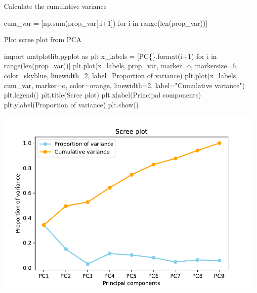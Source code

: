 \documentclass[
  10pt,
]{article}
\newenvironment{Shaded}{\begin{snugshade}}{\end{snugshade}}
\newcommand{\NormalTok}[1]{#1}
\begin{document}
Calculate the cumulative variance

\begin{Shaded}
\begin{Highlighting}[]
\NormalTok{cum\_var = [np.sum(prop\_var[:i+1]) for i in range(len(prop\_var))]}
\end{Highlighting}
\end{Shaded}

Plot scree plot from PCA

\begin{Shaded}
\begin{Highlighting}[]
\NormalTok{import matplotlib.pyplot as plt}
\NormalTok{x\_labels = [\textquotesingle{}PC\{\}\textquotesingle{}.format(i+1) for i in range(len(prop\_var))]}
\NormalTok{plt.plot(x\_labels, prop\_var, marker=\textquotesingle{}o\textquotesingle{}, markersize=6, color=\textquotesingle{}skyblue\textquotesingle{}, }
\NormalTok{  linewidth=2, label=\textquotesingle{}Proportion of variance\textquotesingle{})}
\NormalTok{plt.plot(x\_labels, cum\_var, marker=\textquotesingle{}o\textquotesingle{}, color=\textquotesingle{}orange\textquotesingle{}, linewidth=2, }
\NormalTok{  label="Cumulative variance")}
\NormalTok{plt.legend()}
\NormalTok{plt.title(\textquotesingle{}Scree plot\textquotesingle{})}
\NormalTok{plt.xlabel(\textquotesingle{}Principal components\textquotesingle{})}
\NormalTok{plt.ylabel(\textquotesingle{}Proportion of variance\textquotesingle{})}
\NormalTok{plt.show()}
\end{Highlighting}
\end{Shaded}

\includegraphics{RandPytonAnalysisPDF_files/figure-latex/unnamed-chunk-8-1.pdf}
\end{document}
